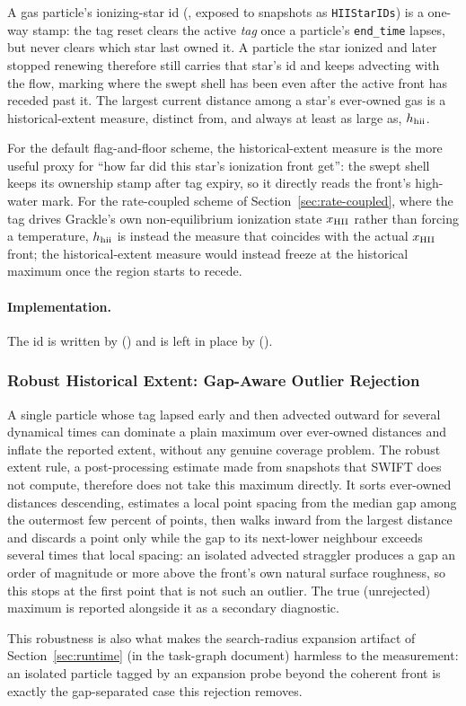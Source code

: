 A gas particle's
ionizing-star id (, exposed to snapshots as
\texttt{HIIStarIDs}) is a one-way stamp: the tag reset clears the active
\emph{tag} once a particle's \texttt{end\_time} lapses, but never
clears which star last owned it. A particle the star ionized and later
stopped renewing therefore still carries that star's id and keeps
advecting with the flow, marking where the swept shell has been even
after the active front has receded past it. The largest current
distance among a star's ever-owned gas is a historical-extent measure,
distinct from, and always at least as large as, $h_{\rm hii}$.

For the default flag-and-floor scheme, the historical-extent measure
is the more useful proxy for ``how far did this star's ionization
front get'': the swept shell keeps its ownership stamp after tag
expiry, so it directly reads the front's high-water mark. For the
rate-coupled scheme of Section~\ref{sec:rate-coupled}, where the tag
drives Grackle's own non-equilibrium ionization state $x_{\rm HII}$
rather than forcing a temperature, $h_{\rm hii}$ is instead the
measure that coincides with the actual $x_{\rm HII}$ front; the
historical-extent measure would instead freeze at the historical
maximum once the region starts to recede.

\paragraph{Implementation.} The id is written by 
() and is left in place by
 ().

\subsubsection{Robust Historical Extent: Gap-Aware Outlier Rejection}

A
single particle whose tag lapsed early and then advected outward for
several dynamical times can dominate a plain maximum over ever-owned
distances and inflate the reported extent, without any genuine coverage problem. The robust extent rule, a post-processing
estimate made from snapshots that SWIFT does not compute, therefore does not
take this maximum directly. It sorts ever-owned distances descending, estimates a local point
spacing from the median gap among the outermost few percent of
points, then walks inward from the largest distance and discards a
point only while the gap to its next-lower neighbour exceeds several
times that local spacing: an isolated advected straggler produces a
gap an order of magnitude or more above the front's own natural
surface roughness, so this stops at the first point that is not such
an outlier. The true (unrejected) maximum is reported alongside
it as a secondary diagnostic.

This robustness is also what makes the search-radius expansion
artifact of Section~\ref{sec:runtime} (in the task-graph document)
harmless to the measurement: an isolated particle tagged by an
expansion probe beyond the coherent front is exactly the
gap-separated case this rejection removes.
